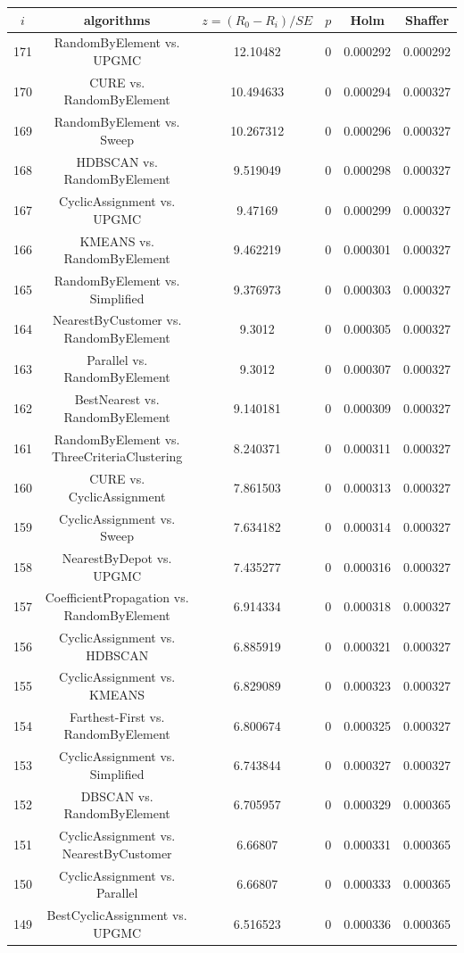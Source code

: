 \documentclass[a4paper,10pt]{article}
\begin{document}
\begin{landscape}
\begin{table}[!htp]
\centering\scriptsize
\begin{tabular}{cccccc}
$i$&algorithms&$z=(R_0 - R_i)/SE$&$p$&Holm&Shaffer\\
\hline171&RandomByElement vs. UPGMC&12.10482&0&0.000292&0.000292\\
170&CURE vs. RandomByElement&10.494633&0&0.000294&0.000327\\
169&RandomByElement vs. Sweep&10.267312&0&0.000296&0.000327\\
168&HDBSCAN vs. RandomByElement&9.519049&0&0.000298&0.000327\\
167&CyclicAssignment vs. UPGMC&9.47169&0&0.000299&0.000327\\
166&KMEANS vs. RandomByElement&9.462219&0&0.000301&0.000327\\
165&RandomByElement vs. Simplified&9.376973&0&0.000303&0.000327\\
164&NearestByCustomer vs. RandomByElement&9.3012&0&0.000305&0.000327\\
163&Parallel vs. RandomByElement&9.3012&0&0.000307&0.000327\\
162&BestNearest vs. RandomByElement&9.140181&0&0.000309&0.000327\\
161&RandomByElement vs. ThreeCriteriaClustering&8.240371&0&0.000311&0.000327\\
160&CURE vs. CyclicAssignment&7.861503&0&0.000313&0.000327\\
159&CyclicAssignment vs. Sweep&7.634182&0&0.000314&0.000327\\
158&NearestByDepot vs. UPGMC&7.435277&0&0.000316&0.000327\\
157&CoefficientPropagation vs. RandomByElement&6.914334&0&0.000318&0.000327\\
156&CyclicAssignment vs. HDBSCAN&6.885919&0&0.000321&0.000327\\
155&CyclicAssignment vs. KMEANS&6.829089&0&0.000323&0.000327\\
154&Farthest-First vs. RandomByElement&6.800674&0&0.000325&0.000327\\
153&CyclicAssignment vs. Simplified&6.743844&0&0.000327&0.000327\\
152&DBSCAN vs. RandomByElement&6.705957&0&0.000329&0.000365\\
151&CyclicAssignment vs. NearestByCustomer&6.66807&0&0.000331&0.000365\\
150&CyclicAssignment vs. Parallel&6.66807&0&0.000333&0.000365\\
149&BestCyclicAssignment vs. UPGMC&6.516523&0&0.000336&0.000365\\

\end{tabular}
\end{table}
\end{landscape}
\end{document}
